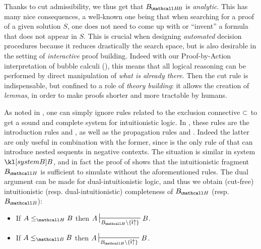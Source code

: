 Thanks to cut admissibility, we thus get that $\sysBHB$ is \emph{analytic}. This
has many nice consequences, a well-known one being that when searching for a
proof of a given solution $S$, one does not need to come up with or ``invent'' a
formula that does not appear in $S$. This is crucial when designing
\emph{automated} decision procedures because it reduces drastically the search
space, but is also desirable in the setting of \emph{interactive} proof
building. Indeed with our Proof-by-Action interpretation of bubble calculi
(), this means that all logical reasoning can be performed
by direct manipulation of \emph{what is already there}. Then the cut rule is
indispensable, but confined to a role of \emph{theory building}: it allows the
creation of \emph{lemmas}, in order to make proofs shorter and more tractable by
humans.

As noted in \cite{postniece_deep_2009}, one can simply ignore rules related to
the exclusion connective $\subset$ to get a sound and complete system for
intuitionistic logic. In , these rules are the introduction rules
 and , as well as the propagation rules
 and . Indeed the latter are only useful in
combination with the former, since  is the only rule of
 that can introduce nested sequents in negative contexts. The
situation is similar in system $\sysB$, and in fact the proof of
 shows that the intuitionistic fragment $\sysBH$ is
sufficient to simulate  without the aforementioned rules. The dual
argument can be made for dual-intuitionistic logic, and thus we obtain
(cut-free) intuitionistic (resp. dual-intuitionistic) completeness of $\sysBH$
(resp. $\sysBB$):

\begin{corollary}
  \sbr
  \begin{itemize}
    \item If $A \sementH B$ then $A \prov{\sysBH \setminus
    \{\rsf{i{\ua}}\}} B$.
    \item If $A \sementB B$ then $A \prov{\sysBB \setminus
    \{\rsf{i{\ua}}\}} B$.
  \end{itemize}
\end{corollary}


